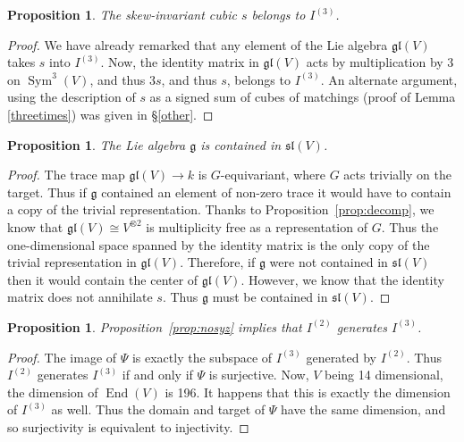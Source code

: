 \documentclass{amsart}
\newtheorem{proposition}[theorem]{Proposition}
\theoremstyle{definition}
\theoremstyle{remark}
\DeclareMathOperator{\Sym}{Sym}
\DeclareMathOperator{\End}{End}
\let\mf\mathfrak
\begin{document}
\begin{proposition}
\label{prop:skew-ideal}
The skew-invariant cubic $s$ belongs to $I^{(3)}$.
\end{proposition}

\begin{proof}
We have already remarked that any element of the Lie algebra $\mf{gl}(V)$
takes $s$ into $I^{(3)}$.  Now, the identity matrix in $\mf{gl}(V)$ acts by
multiplication by 3 on $\Sym^3(V)$, and thus $3s$, and thus $s$, belongs to
$I^{(3)}$. An alternate argument, using the description of $s$ as a signed sum
of cubes of matchings (proof of Lemma \ref{threetimes}) was given in
\S \ref{other}.
\end{proof}

\begin{proposition}
The Lie algebra $\mf{g}$ is contained in $\mf{sl}(V)$.
\end{proposition}

\begin{proof}
The trace map $\mf{gl}(V) \to k$ is $G$-equivariant, where $G$ acts trivially
on the target.  Thus if $\mf{g}$ contained an element of non-zero trace it
would have to contain a copy of the trivial representation.  Thanks to
Proposition~\ref{prop:decomp}, we know that $\mf{gl}(V) \cong V^{\otimes 2}$
is multiplicity free as a representation of $G$.  Thus the one-dimensional
space spanned by the identity matrix is the only copy of the trivial
representation in $\mf{gl}(V)$.  Therefore, if $\mf{g}$ were not contained in
$\mf{sl}(V)$ then it would contain the center of $\mf{gl}(V)$.  However,
we know that the identity matrix does not annihilate $s$.  Thus $\mf{g}$ must
be contained in $\mf{sl}(V)$.
\end{proof}

\begin{proposition}
\label{prop:i2-i3}
Proposition~\ref{prop:nosyz} implies that $I^{(2)}$ generates $I^{(3)}$.
\end{proposition}

\begin{proof}
The image of $\Psi$ is exactly the subspace of $I^{(3)}$ generated by $I^{(2)}$.
Thus $I^{(2)}$ generates $I^{(3)}$ if and only if $\Psi$ is surjective.  Now, $V$
being 14 dimensional, the dimension of $\End(V)$ is 196.  It happens that this
is exactly the dimension of $I^{(3)}$ as well.  Thus the domain and target of
$\Psi$ have the same dimension, and so surjectivity is equivalent to injectivity.
\end{proof}
\end{document}
